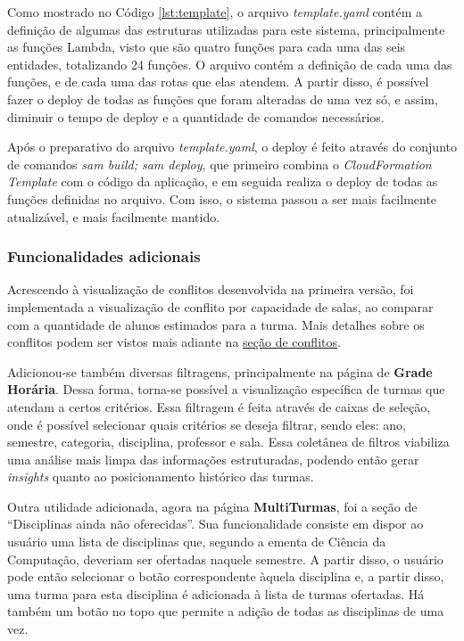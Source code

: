Como mostrado no Código \ref{lst:template}, o arquivo \textit{template.yaml} contém a definição de algumas das estruturas utilizadas para este sistema, principalmente as funções Lambda, visto que são quatro funções para cada uma das seis entidades, totalizando 24 funções. O arquivo contém a definição de cada uma das funções, e de cada uma das rotas que elas atendem. A partir disso, é possível fazer o deploy de todas as funções que foram alteradas de uma vez só, e assim, diminuir o tempo de deploy e a quantidade de comandos necessários.

Após o preparativo do arquivo \textit{template.yaml}, o deploy é feito através do conjunto de comandos \textit{sam build; sam deploy}, que primeiro combina o \textit{CloudFormation Template} com o código da aplicação, e em seguida realiza o deploy de todas as funções definidas no arquivo. Com isso, o sistema passou a ser mais facilmente atualizável, e mais facilmente mantido.

\subsubsection{Funcionalidades adicionais}

Acrescendo à visualização de conflitos desenvolvida na primeira versão, foi implementada a visualização de conflito por capacidade de salas, ao comparar com a quantidade de alunos estimados para a turma. Mais detalhes sobre os conflitos podem ser vistos mais adiante na \hyperref[Conflitos]{seção de conflitos}.

Adicionou-se também diversas filtragens, principalmente na página de \textbf{Grade Horária}. Dessa forma, torna-se possível a visualização específica de turmas que atendam a certos critérios. Essa filtragem é feita através de caixas de seleção, onde é possível selecionar quais critérios se deseja filtrar, sendo eles: ano, semestre, categoria, disciplina, professor e sala. Essa coletânea de filtros viabiliza uma análise mais limpa das informações estruturadas, podendo então gerar \textit{insights} quanto ao posicionamento histórico das turmas.

Outra utilidade adicionada, agora na página \textbf{MultiTurmas}, foi a seção de ``Disciplinas ainda não oferecidas''. Sua funcionalidade consiste em dispor ao usuário uma lista de disciplinas que, segundo a ementa de Ciência da Computação, deveriam ser ofertadas naquele semestre. A partir disso, o usuário pode então selecionar o botão correspondente àquela disciplina e, a partir disso, uma turma para esta disciplina é adicionada à lista de turmas ofertadas. Há também um botão no topo que permite a adição de todas as disciplinas de uma vez.

